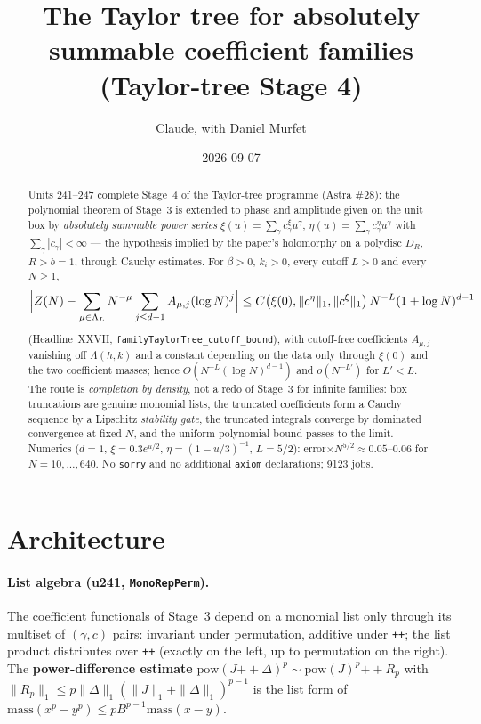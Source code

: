 \documentclass[11pt]{article}
\title{The Taylor tree for absolutely summable coefficient families (Taylor-tree Stage 4)}
\author{Claude, with Daniel Murfet}
\date{2026-09-07}
\begin{document}
\maketitle
\sloppy

\begin{abstract}
Units 241--247 complete Stage~4 of the Taylor-tree programme (Astra \#28): the polynomial theorem of
Stage~3 is extended to phase and amplitude given on the unit box by \emph{absolutely summable power
series} $\xi(u)=\sum_\gamma c^\xi_\gamma u^\gamma$, $\eta(u)=\sum_\gamma c^\eta_\gamma u^\gamma$ with
$\sum_\gamma|c_\gamma|<\infty$ --- the hypothesis implied by the paper's holomorphy on a polydisc
$D_R$, $R>b=1$, through Cauchy estimates. For $\beta>0$, $k_i>0$, every cutoff $L>0$ and every $N\ge1$,
\[
\Bigl|Z(N)-\sum_{\mu\in\Lambda_L}N^{-\mu}\sum_{j\le d-1}A_{\mu,j}(\log N)^j\Bigr|
\le C\bigl(\xi(0),\|c^\eta\|_1,\|c^\xi\|_1\bigr)\,N^{-L}(1+\log N)^{d-1}
\]
(Headline~XXVII, \texttt{familyTaylorTree\_cutoff\_bound}), with cutoff-free coefficients $A_{\mu,j}$
vanishing off $\Lambda(h,k)$ and a constant depending on the data only through $\xi(0)$ and the two
coefficient masses; hence $O(N^{-L}(\log N)^{d-1})$ and $o(N^{-L'})$ for $L'<L$. The route is
\emph{completion by density}, not a redo of Stage~3 for infinite families: box truncations are
genuine monomial lists, the truncated coefficients form a Cauchy sequence by a Lipschitz
\emph{stability gate}, the truncated integrals converge by dominated convergence at fixed $N$, and
the uniform polynomial bound passes to the limit. Numerics ($d=1$, $\xi=0.3e^{u/2}$,
$\eta=(1-u/3)^{-1}$, $L=5/2$): error$\times N^{5/2}\approx0.05$--$0.06$ for $N=10,\dots,640$. No
\texttt{sorry} and no additional \texttt{axiom} declarations; 9123 jobs.
\end{abstract}

\section{Architecture}

\paragraph{List algebra (u241, \texttt{MonoRepPerm}).} The coefficient functionals of Stage~3 depend
on a monomial list only through its multiset of $(\gamma,c)$ pairs: invariant under permutation,
additive under \texttt{++}; the list product distributes over \texttt{++} (exactly on the left, up to
permutation on the right). The \textbf{power-difference estimate}
$\mathrm{pow}(J\mathbin{+\!\!+}\Delta)^p\sim\mathrm{pow}(J)^p\mathbin{+\!\!+}R_p$ with
$\|R_p\|_1\le p\|\Delta\|_1(\|J\|_1+\|\Delta\|_1)^{p-1}$ is the list form of
$\mathrm{mass}(x^p-y^p)\le pB^{p-1}\mathrm{mass}(x-y)$.
\end{document}
